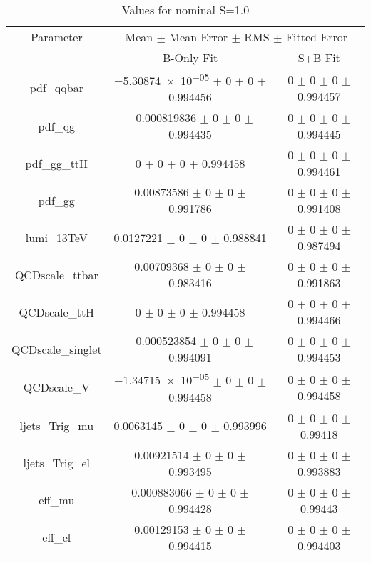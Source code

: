 \begin{table}
\centering
\caption{Values for nominal S=1.0}
\begin{tabular}{ccc}
\toprule
Parameter & \multicolumn{2}{c}{Mean $\pm$ Mean Error $\pm$ RMS $\pm$ Fitted Error}\\
 & B-Only Fit & S+B Fit\\
\midrule
pdf\_qqbar & \num{-5.30874e-05} $\pm$ \num{0} $\pm$ \num{0} $\pm$ \num{0.994456} & \num{0} $\pm$ \num{0} $\pm$ \num{0} $\pm$ \num{0.994457}\\
pdf\_qg & \num{-0.000819836} $\pm$ \num{0} $\pm$ \num{0} $\pm$ \num{0.994435} & \num{0} $\pm$ \num{0} $\pm$ \num{0} $\pm$ \num{0.994445}\\
pdf\_gg\_ttH & \num{0} $\pm$ \num{0} $\pm$ \num{0} $\pm$ \num{0.994458} & \num{0} $\pm$ \num{0} $\pm$ \num{0} $\pm$ \num{0.994461}\\
pdf\_gg & \num{0.00873586} $\pm$ \num{0} $\pm$ \num{0} $\pm$ \num{0.991786} & \num{0} $\pm$ \num{0} $\pm$ \num{0} $\pm$ \num{0.991408}\\
lumi\_13TeV & \num{0.0127221} $\pm$ \num{0} $\pm$ \num{0} $\pm$ \num{0.988841} & \num{0} $\pm$ \num{0} $\pm$ \num{0} $\pm$ \num{0.987494}\\
QCDscale\_ttbar & \num{0.00709368} $\pm$ \num{0} $\pm$ \num{0} $\pm$ \num{0.983416} & \num{0} $\pm$ \num{0} $\pm$ \num{0} $\pm$ \num{0.991863}\\
QCDscale\_ttH & \num{0} $\pm$ \num{0} $\pm$ \num{0} $\pm$ \num{0.994458} & \num{0} $\pm$ \num{0} $\pm$ \num{0} $\pm$ \num{0.994466}\\
QCDscale\_singlet & \num{-0.000523854} $\pm$ \num{0} $\pm$ \num{0} $\pm$ \num{0.994091} & \num{0} $\pm$ \num{0} $\pm$ \num{0} $\pm$ \num{0.994453}\\
QCDscale\_V & \num{-1.34715e-05} $\pm$ \num{0} $\pm$ \num{0} $\pm$ \num{0.994458} & \num{0} $\pm$ \num{0} $\pm$ \num{0} $\pm$ \num{0.994458}\\
ljets\_Trig\_mu & \num{0.0063145} $\pm$ \num{0} $\pm$ \num{0} $\pm$ \num{0.993996} & \num{0} $\pm$ \num{0} $\pm$ \num{0} $\pm$ \num{0.99418}\\
ljets\_Trig\_el & \num{0.00921514} $\pm$ \num{0} $\pm$ \num{0} $\pm$ \num{0.993495} & \num{0} $\pm$ \num{0} $\pm$ \num{0} $\pm$ \num{0.993883}\\
eff\_mu & \num{0.000883066} $\pm$ \num{0} $\pm$ \num{0} $\pm$ \num{0.994428} & \num{0} $\pm$ \num{0} $\pm$ \num{0} $\pm$ \num{0.99443}\\
eff\_el & \num{0.00129153} $\pm$ \num{0} $\pm$ \num{0} $\pm$ \num{0.994415} & \num{0} $\pm$ \num{0} $\pm$ \num{0} $\pm$ \num{0.994403}\\

\end{tabular}
\end{table}
